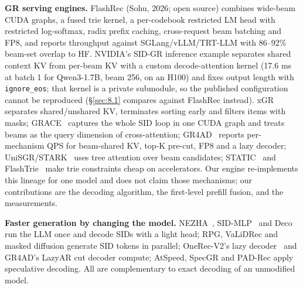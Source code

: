 \documentclass[11pt]{article}
\newcommand{\code}[1]{\texttt{#1}}
\begin{document}
\textbf{GR serving engines.} FlashRec (Sohu, 2026; open source) combines wide-beam CUDA graphs, a fused trie kernel, a per-codebook restricted LM head with restricted log-softmax, radix prefix caching, cross-request beam batching and FP8, and reports throughput against SGLang/vLLM/TRT-LLM with 86–92\% beam-set overlap to HF. NVIDIA's SID-GR inference example separates shared context KV from per-beam KV with a custom decode-attention kernel (17.6 ms at batch 1 for Qwen3-1.7B, beam 256, on an H100) and fixes output length with \code{ignore\_\allowbreak{}eos}; that kernel is a private submodule, so the published configuration cannot be reproduced (\S\ref{sec:8.1} compares against FlashRec instead). xGR~\cite{ax2512.11529} separates shared/unshared KV, terminates sorting early and filters items with masks; GRACE~\cite{ax2608.00938} captures the whole SID loop in one CUDA graph and treats beams as the query dimension of cross-attention; GR4AD~\cite{ax2602.22732} reports per-mechanism QPS for beam-shared KV, top-K pre-cut, FP8 and a lazy decoder; UniSGR/STARK~\cite{ax2607.04068} uses tree attention over beam candidates; STATIC~\cite{ax2602.22647} and FlashTrie~\cite{ax2607.10044} make trie constraints cheap on accelerators. Our engine re-implements this lineage for one model and does not claim those mechanisms; our contributions are the decoding algorithm, the first-level prefill fusion, and the measurements.

\textbf{Faster generation by changing the model.} NEZHA~\cite{ax2511.18793}, SID-MLP~\cite{ax2605.12617} and Deco~\cite{ax2610.32980} run the LLM once and decode SIDs with a light head; RPG, VaLiDRec and masked diffusion generate SID tokens in parallel; OneRec-V2's lazy decoder~\cite{ax2508.20900} and GR4AD's LazyAR cut decoder compute; AtSpeed, SpecGR and PAD-Rec apply speculative decoding. All are complementary to exact decoding of an unmodified model.
\end{document}
